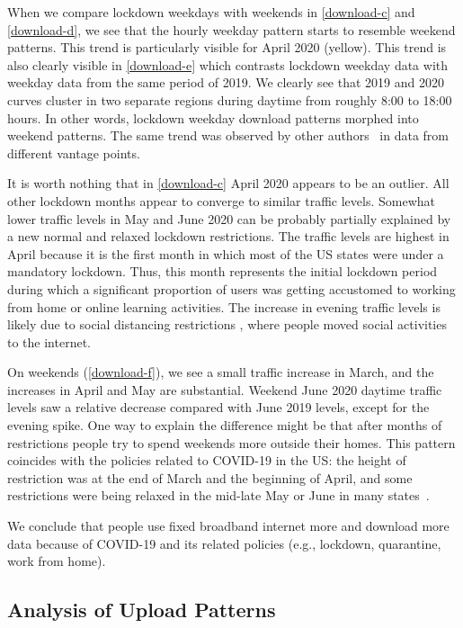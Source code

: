 When we compare lockdown weekdays with weekends in \cref{download-c} and \cref{download-d}, we see that the hourly weekday pattern starts to resemble weekend patterns. This trend is particularly visible for April 2020 (yellow). This trend is also clearly visible in \cref{download-e} which contrasts lockdown weekday data with weekday data from the same period of 2019. We clearly see that 2019 and 2020 curves cluster in two separate regions during daytime from roughly 8:00 to 18:00 hours. In other words, lockdown weekday download patterns morphed into weekend patterns. The same trend was observed by other authors~\cite{feldmann2020lockdown} in data from different vantage points.

It is worth nothing that in \cref{download-c} April 2020 appears to be an outlier. All other lockdown months appear to converge to similar traffic levels. Somewhat lower traffic levels in May and June 2020 can be probably partially explained by a new normal and relaxed lockdown restrictions. The traffic levels are highest in April because it is the first month in which most of the \gls{US} states were under a mandatory lockdown. Thus, this month represents the initial lockdown period during which a significant proportion of users was getting accustomed to working from home or online learning activities. The increase in evening traffic levels is likely due to social distancing restrictions \cite{lockdownsguide}, where people moved social activities to the internet.

On weekends (\cref{download-f}), we see a small traffic increase in March, and the increases in April and May are substantial. Weekend June 2020 daytime traffic levels saw a relative decrease compared with June 2019 levels, except for the evening spike. One way to explain the difference might be that after months of restrictions people try to spend weekends more outside their homes. This pattern coincides with the policies related to COVID-19 in the \gls{US}: the height of restriction was at the end of March and the beginning of April, and some restrictions were being relaxed in the mid-late May or June in many states~\cite{covid19restriction}.

We conclude that people use fixed broadband internet more and download more data because of COVID-19 and its related policies (e.g., lockdown, quarantine, work from home).

\subsection{Analysis of Upload Patterns}\label{sec:analysis-of-upload-patterns}

